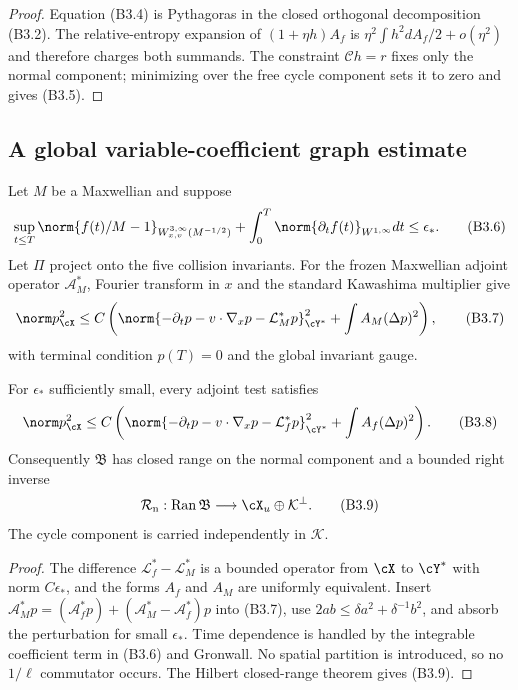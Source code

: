 \begin{proof}
Equation (B3.4) is Pythagoras in the closed orthogonal decomposition (B3.2).
The relative-entropy expansion of $(1+\eta h)A_f$ is
$\eta^2\int h^2dA_f/2+o(\eta^2)$ and therefore charges both summands.  The
constraint $\mathcal Ch=r$ fixes only the normal component; minimizing over
the free cycle component sets it to zero and gives (B3.5).
\end{proof}

\subsection{A global variable-coefficient graph estimate}

Let $M$ be a Maxwellian and suppose
\[
 \sup_{t\le T}\norm{f(t)/M-1}_{W^{3,\infty}_{x,v}(M^{-1/2})}
 +\int_0^T\norm{\partial_tf(t)}_{W^{1,\infty}}dt
 \le\epsilon_* .                                         \tag{B3.6}
\]
Let $\Pi$ project onto the five collision invariants.  For the frozen
Maxwellian adjoint operator $\mathcal A_M^*$, Fourier transform in $x$ and the
standard Kawashima multiplier give
\[
 \norm p_{\cX}^2\le C
 \left(\norm{-\partial_tp-v\cdot\nabla_xp-\mathcal L_M^*p}_{\cY^*}^2
       +\int A_M(\Delta p)^2\right),                       \tag{B3.7}
\]
with terminal condition $p(T)=0$ and the global invariant gauge.

\begin{theorem}
\label{thm:r29-b3-observe}
For $\epsilon_*$ sufficiently small, every adjoint test satisfies
\[
 \norm p_{\cX}^2\le C
 \left(\norm{-\partial_tp-v\cdot\nabla_xp-\mathcal L_f^*p}_{\cY^*}^2
       +\int A_f(\Delta p)^2\right).                       \tag{B3.8}
\]
Consequently $\mathfrak B$ has closed range on the normal component and a
bounded right inverse
\[
 \mathcal R_{\rm n}:\operatorname{Ran}\mathfrak B
 \longrightarrow\cX_u\oplus\mathcal K^\perp.             \tag{B3.9}
\]
The cycle component is carried independently in $\mathcal K$.
\end{theorem}

\begin{proof}
The difference
$\mathcal L_f^*-\mathcal L_M^*$ is a bounded operator from $\cX$ to
$\cY^*$ with norm $C\epsilon_*$, and the forms $A_f$ and $A_M$ are uniformly
equivalent.  Insert
$\mathcal A_M^*p=(\mathcal A_f^*p)+
(\mathcal A_M^*-\mathcal A_f^*)p$ into (B3.7), use
$2ab\le\delta a^2+\delta^{-1}b^2$, and absorb the perturbation for small
$\epsilon_*$.  Time dependence is handled by the integrable coefficient term
in (B3.6) and Gronwall.  No spatial partition is introduced, so no
$1/\ell$ commutator occurs.  The Hilbert closed-range theorem gives (B3.9).
\end{proof}

